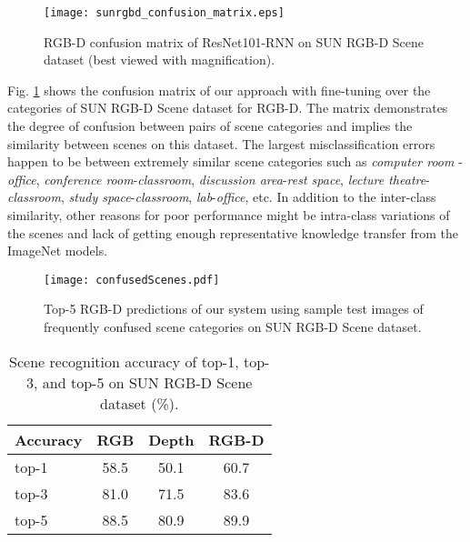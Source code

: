 \documentclass[10pt,journal,compsoc]{IEEEtran}
\begin{document}
\begin{figure}[!b]
	\begin{center}
		\texttt{[image: sunrgbd\_confusion\_matrix.eps]}
	\end{center}
	\caption{RGB-D confusion matrix of ResNet101-RNN on SUN RGB-D Scene dataset (best viewed with magnification).}
	\label{fig:sunrgbdConfusionMatrix}
\end{figure}

Fig. \ref{fig:sunrgbdConfusionMatrix} shows the confusion matrix of our approach with fine-tuning over the  categories of SUN RGB-D Scene dataset for RGB-D. The matrix demonstrates the degree of confusion between pairs of scene categories and implies the similarity between scenes on this dataset. The largest misclassification errors happen to be between extremely similar scene categories such as \textit{computer room} - \textit{office}, \textit{conference room}-\textit{classroom}, \textit{discussion area}-\textit{rest space}, \textit{lecture theatre}-\textit{classroom}, \textit{study space}-\textit{classroom}, \textit{lab}-\textit{office}, etc. In addition to the inter-class similarity, other reasons for poor performance might be intra-class variations of the scenes and lack of getting enough representative knowledge transfer from the ImageNet models. 

\begin{figure}[!t]
	\begin{center}
		\texttt{[image: confusedScenes.pdf]}
	\end{center}
	\caption{Top-5 RGB-D predictions of our system using sample test images of frequently confused scene categories on SUN RGB-D Scene dataset.}
	\label{fig:sunrgbdConfusedSamples}
\end{figure}

\begin{table}[!h]
	\caption{Scene recognition accuracy of top-1, top-3, and top-5 on SUN RGB-D Scene dataset (\%).}
	\begin{center}
		\setlength{\tabcolsep}{0.9em} \def\arraystretch{1.2}
		\begin{adjustbox}{width=0.65\columnwidth}
		\begin{tabular}{ lccc }
			\hline
			Accuracy			& RGB 				& Depth 			& RGB-D \\ \hline \hline
			top-1    			& 58.5 				& 50.1 	 			& 60.7 		\\ top-3    			& 81.0 				& 71.5 	 			& 83.6 		\\ top-5    			& 88.5 				& 80.9 	 			& 89.9 		\\ \hline
		\end{tabular}
		\end{adjustbox}
		\label{table:top135sceneResults}
	\end{center}
\end{table}
\end{document}
